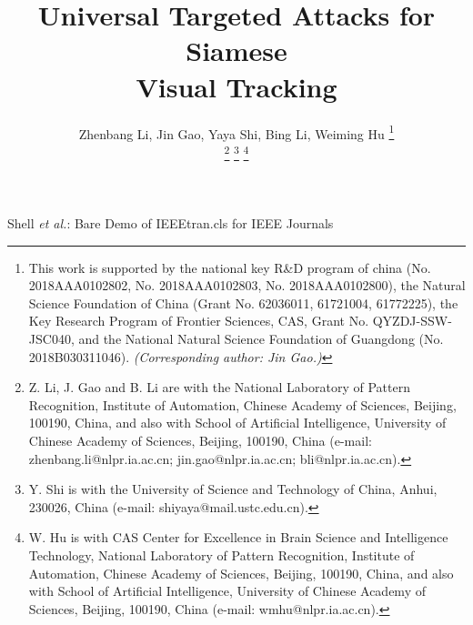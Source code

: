 \documentclass[journal]{IEEEtran}
\begin{document}
\title{Universal Targeted Attacks for Siamese \\ Visual Tracking}
\author{
  Zhenbang Li, Jin Gao, Yaya Shi, Bing Li, Weiming Hu
  \thanks{This work is supported by the national key R\&D program of china (No. 2018AAA0102802, No. 2018AAA0102803, No. 2018AAA0102800), the Natural Science Foundation of China (Grant No. 62036011, 61721004, 61772225), the Key Research Program of Frontier Sciences, CAS, Grant No. QYZDJ-SSW-JSC040, and the National Natural Science Foundation of Guangdong (No. 2018B030311046). \textit{(Corresponding author: Jin Gao.)}}
  
  \thanks{Z. Li, J. Gao and B. Li are with the National Laboratory of Pattern Recognition, Institute of Automation, Chinese Academy of Sciences, Beijing, 100190, China, and also with School of Artificial Intelligence, University of Chinese Academy of Sciences, Beijing, 100190, China (e-mail: zhenbang.li@nlpr.ia.ac.cn; jin.gao@nlpr.ia.ac.cn; bli@nlpr.ia.ac.cn).}
  \thanks{Y. Shi is with the University of Science and Technology of China, Anhui, 230026, China (e-mail: shiyaya@mail.ustc.edu.cn).}
  \thanks{W. Hu is with CAS Center for Excellence in Brain Science and Intelligence Technology, National Laboratory of Pattern Recognition, Institute of Automation, Chinese Academy of Sciences, Beijing, 100190, China, and also with School of Artificial Intelligence, University of Chinese Academy of Sciences, Beijing, 100190, China (e-mail: wmhu@nlpr.ia.ac.cn).}
}

{Shell \MakeLowercase{\textit{et al.}}: Bare Demo of IEEEtran.cls for IEEE Journals}
\maketitle
\end{document}
